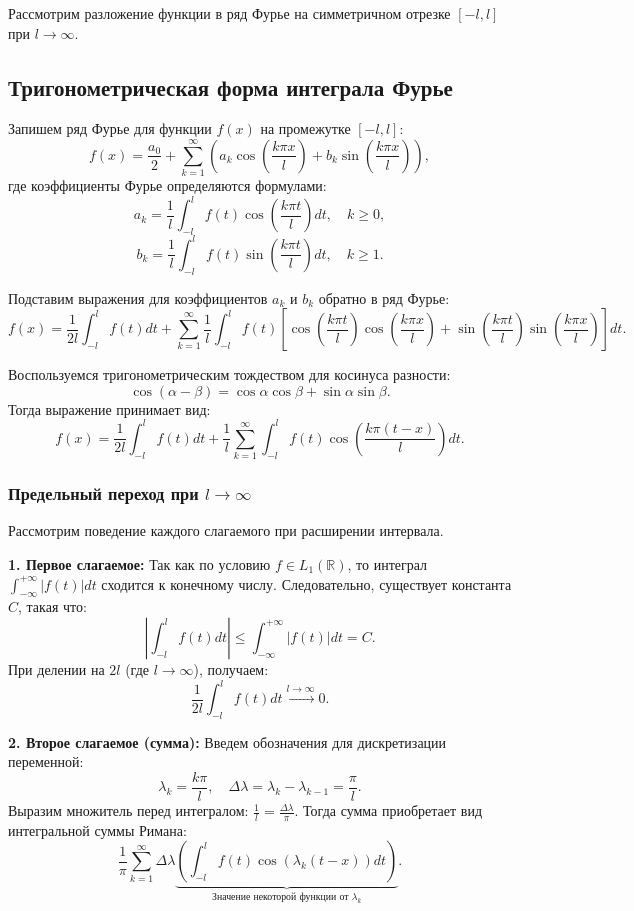 \documentclass[12pt,a4paper,openany]{book}
\begin{document}
Рассмотрим разложение функции в ряд Фурье на симметричном отрезке $[-l, l]$ при $l \to \infty$.

\subsection{ Тригонометрическая форма интеграла Фурье}
Запишем ряд Фурье для функции $f(x)$ на промежутке $[-l, l]$:
\begin{equation}
    f(x) = \frac{a_0}{2} + \sum_{k=1}^{\infty} \left( a_k \cos\left(\frac{k\pi x}{l}\right) + b_k \sin\left(\frac{k\pi x}{l}\right) \right),
\end{equation}
где коэффициенты Фурье определяются формулами:
$$
a_k = \frac{1}{l} \int_{-l}^{l} f(t) \cos\left(\frac{k\pi t}{l}\right) dt, \quad k \ge 0,
$$
$$
b_k = \frac{1}{l} \int_{-l}^{l} f(t) \sin\left(\frac{k\pi t}{l}\right) dt, \quad k \ge 1.
$$

Подставим выражения для коэффициентов $a_k$ и $b_k$ обратно в ряд Фурье:
$$
f(x) = \frac{1}{2l} \int_{-l}^{l} f(t) dt + \sum_{k=1}^{\infty} \frac{1}{l} \int_{-l}^{l} f(t) \left[ \cos\left(\frac{k\pi t}{l}\right) \cos\left(\frac{k\pi x}{l}\right) + \sin\left(\frac{k\pi t}{l}\right) \sin\left(\frac{k\pi x}{l}\right) \right] dt.
$$

Воспользуемся тригонометрическим тождеством для косинуса разности:
$$
\cos(\alpha - \beta) = \cos \alpha \cos \beta + \sin \alpha \sin \beta.
$$
Тогда выражение принимает вид:
\begin{equation}
    f(x) = \frac{1}{2l} \int_{-l}^{l} f(t) dt + \frac{1}{l} \sum_{k=1}^{\infty} \int_{-l}^{l} f(t) \cos\left( \frac{k\pi (t-x)}{l} \right) dt.
\end{equation}

\subsubsection{Предельный переход при $l \to \infty$}
Рассмотрим поведение каждого слагаемого при расширении интервала.

\textbf{1. Первое слагаемое:}
Так как по условию $f \in L_1(\mathbb{R})$, то интеграл $\int_{-\infty}^{+\infty} |f(t)| dt$ сходится к конечному числу. Следовательно, существует константа $C$, такая что:
$$
\left| \int_{-l}^{l} f(t) dt \right| \le \int_{-\infty}^{+\infty} |f(t)| dt = C.
$$
При делении на $2l$ (где $l \to \infty$), получаем:
$$
\frac{1}{2l} \int_{-l}^{l} f(t) dt \xrightarrow{l \to \infty} 0.
$$

\textbf{2. Второе слагаемое (сумма):}
Введем обозначения для дискретизации переменной:
$$
\lambda_k = \frac{k\pi}{l}, \quad \Delta \lambda = \lambda_k - \lambda_{k-1} = \frac{\pi}{l}.
$$
Выразим множитель перед интегралом: $\frac{1}{l} = \frac{\Delta \lambda}{\pi}$.
Тогда сумма приобретает вид интегральной суммы Римана:
$$
\frac{1}{\pi} \sum_{k=1}^{\infty} \Delta \lambda \underbrace{\left( \int_{-l}^{l} f(t) \cos(\lambda_k(t-x)) dt \right)}_{\text{Значение некоторой функции от } \lambda_k}.
$$
\end{document}
